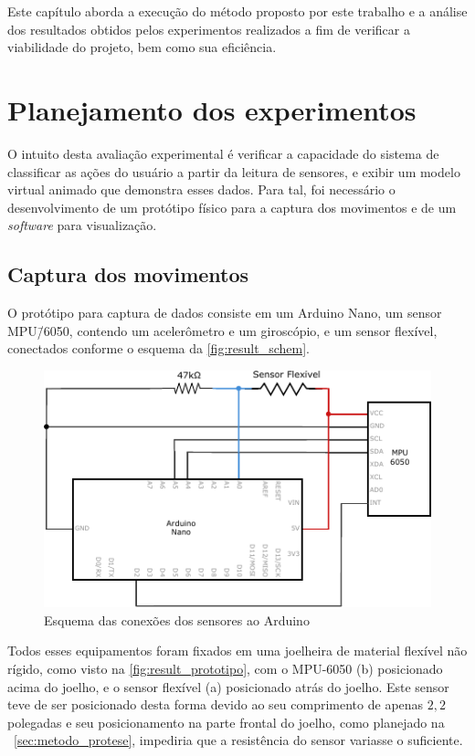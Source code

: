Este capítulo aborda a execução do método proposto por este trabalho e a análise dos resultados obtidos pelos experimentos realizados a fim de verificar a viabilidade do projeto, bem como sua eficiência.

\section{Planejamento dos experimentos}\label{sec:result_planejamento}
O intuito desta avaliação experimental é verificar a capacidade do sistema \productname{} de classificar as ações do usuário a partir da leitura de sensores, e exibir um modelo virtual animado que demonstra esses dados. Para tal, foi necessário o desenvolvimento de um protótipo físico para a captura dos movimentos e de um \textit{software} para visualização.

\subsection{Captura dos movimentos}\label{sec:result_captura}
O protótipo para captura de dados consiste em um Arduino Nano, um sensor MPU\=/6050, contendo um acelerômetro e um giroscópio, e um sensor flexível, conectados conforme o esquema da \autoref{fig:result_schem}. 

\begin{figure}[ht]
	\caption{\label{fig:result_schem}Esquema das conexões dos sensores ao Arduino}
	\begin{center}
	    \includegraphics[width=.8\textwidth]{resources/result_schem}
	\end{center}
\end{figure}

Todos esses equipamentos foram fixados em uma joelheira de material flexível não rígido, como visto na \autoref{fig:result_prototipo}, com o MPU-6050 (b) posicionado acima do joelho, e o sensor flexível (a) posicionado atrás do joelho. Este sensor teve de ser posicionado desta forma devido ao seu comprimento de apenas \(2{,}2\) polegadas e seu posicionamento na parte frontal do joelho, como planejado na ~\autoref{sec:metodo_protese}, impediria que a resistência do sensor variasse o suficiente.

